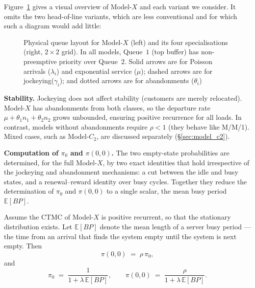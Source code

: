 Figure~\ref{fig:models-queue-overview} gives a visual overview of Model-$X$ and each variant we consider. It omits the two head-of-line variants, which are less conventional and for which such a diagram would add little:
\begin{figure}[H]
    \centering
    \resizebox{\textwidth}{!}{%
    }
    \caption{Physical queue layout for Model-$X$ (left) and its four specialisations (right, $2\times2$ grid). In all models, Queue~$1$ (top buffer) has non-preemptive priority over Queue~$2$. Solid arrows are for Poisson arrivals ($\lambda_i$) and exponential service ($\mu$); dashed arrows are for jockeying($\gamma_i$); and dotted arrows are for abandonments ($\theta_i$)
    }
    \label{fig:models-queue-overview}
\end{figure}

\noindent\textbf{Stability.} Jockeying does not affect stability (customers are merely relocated). Model-$X$ has abandonments from both classes, so the departure rate $\mu + \theta_1 n_1 + \theta_2 n_2$ grows unbounded, ensuring positive recurrence for all loads. In contrast, models without abandonments require $\rho < 1$ (they behave like M/M/1). Mixed cases, such as Model-$C_2$, are discussed separately (\S\ref{sec:model_c2}).

\medskip\noindent\textbf{Computation of $\pi_0$ and $\pi(0,0)$.} The two empty-state probabilities are determined, for the full Model-$X$, by two exact identities that hold irrespective of the jockeying and abandonment mechanisms: a cut between the idle and busy states, and a renewal--reward identity over busy cycles. Together they reduce the determination of $\pi_0$ and $\pi(0,0)$ to a single scalar, the mean busy period $\mathbb{E}[BP]$.

\begin{theorem}\label{thm:gen:boundary}
    Assume the CTMC of Model-$X$ is positive recurrent, so that the stationary distribution exists. Let $\mathbb{E}[BP]$ denote the mean length of a server busy period ---the time from an arrival that finds the system empty until the system is next empty. Then
    \begin{equation}
        \pi(0,0) \;=\; \rho\,\pi_0,
        \label{eq:gen:pi00_general}
    \end{equation}
    and
    \begin{equation}
        \pi_0 \;=\; \frac{1}{1+\lambda\,\mathbb{E}[BP]},
        \qquad
        \pi(0,0) \;=\; \frac{\rho}{1+\lambda\,\mathbb{E}[BP]}.
        \label{eq:gen:pi0_renewal}
    \end{equation}
\end{theorem}

